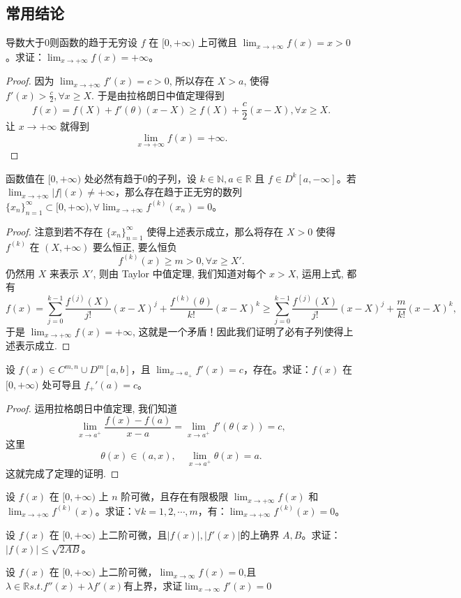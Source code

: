 \documentclass[lang=cn,10pt,thmcnt=section]{elegantbook}
\begin{document}
\subsection{常用结论}
\begin{theorem}
	导数大于0则函数的趋于无穷设 $f$ 在 $[0,+\infty)$ 上可微且 $\lim_{x \to +\infty} f(x) = x > 0$。求证：$\lim_{x \to +\infty} f(x) = +\infty$。
\end{theorem}
\begin{proof}
	因为 $\lim_{x\to+\infty} f'(x) = c > 0$, 所以存在 $X > a$, 使得 $f'(x) > \frac{c}{2}, \forall x \ge X$. 于是由拉格朗日中值定理得到
\[
f(x) = f(X) + f'(\theta)(x-X) \ge f(X) + \frac{c}{2}(x-X), \forall x \ge X.
\]
让 $x \to +\infty$ 就得到
\[
\lim_{x\to+\infty} f(x) = +\infty.
\]
\end{proof}
\begin{theorem}
	函数值在 $[0,+\infty)$ 处必然有趋于0的子列，设 $k \in \mathbb{N}, a \in \mathbb{R}$ 且 $f \in D^k[a,-\infty]$。若 $\lim_{x \to +\infty} |f|(x) \neq +\infty$，那么存在趋于正无穷的数列 $\{x_n\}_{n=1}^\infty \subset [0,+\infty), \forall \lim_{x \to +\infty} f^{(k)}(x_n) = 0$。
\end{theorem}
\begin{proof}
	注意到若不存在 $\{x_n\}_{n=1}^\infty$ 使得上述表示成立，那么将存在 $X>0$ 使得 $f^{(k)}$ 在 $(X, +\infty)$ 要么恒正, 要么恒负
\[
f^{(k)}(x) \ge m > 0, \forall x \ge X'.
\]
仍然用 $X$ 来表示 $X'$, 则由 Taylor 中值定理, 我们知道对每个 $x > X$, 运用上式, 都有
\[
f(x) = \sum_{j=0}^{k-1} \frac{f^{(j)}(X)}{j!}(x-X)^j + \frac{f^{(k)}(\theta)}{k!}(x-X)^k \ge \sum_{j=0}^{k-1} \frac{f^{(j)}(X)}{j!}(x-X)^j + \frac{m}{k!}(x-X)^k,
\]
于是 $\lim_{x\to+\infty} f(x) = +\infty$, 这就是一个矛盾！因此我们证明了必有子列使得上述表示成立.

\end{proof}
\begin{theorem}[导数极限定理]
	设 $f(x) \in C^{m,n} \cup D^m[a,b]$，且 $\lim_{x \to a_+} f'(x) = c$，存在。求证：$f(x)$ 在 $[0,+\infty)$ 处可导且 $f_+'(a) = c$。
\end{theorem}
\begin{proof}
	运用拉格朗日中值定理, 我们知道
\[
\lim_{x\to a^+} \frac{f(x) - f(a)}{x-a} = \lim_{x\to a^+} f'(\theta(x)) = c,
\]
这里
\[
\theta(x) \in (a,x), \quad \lim_{x\to a^+} \theta(x) = a.
\]
这就完成了定理的证明.
\end{proof}
\begin{theorem}[低阶导数控制高阶导数]
	设 $f(x)$ 在 $[0,+\infty)$ 上 $n$ 阶可微，且存在有限极限 $\lim_{x \to +\infty} f(x)$ 和 $\lim_{x \to +\infty} f^{(k)}(x)$。求证：$\forall k = 1,2,\cdots,m$，有：$\lim_{x \to +\infty} f^{(k)}(x) = 0$。
\end{theorem}
\begin{theorem}[低阶导数控制高阶导数]
	设 $f(x)$ 在 $[0,+\infty)$ 上二阶可微，且$
	|f(x)|,|f'(x)|$的上确界 $A,B$。求证：$|f(x)| \leq \sqrt{2AB}$。
\end{theorem}
\begin{theorem}[低阶导数控制高阶导数]
	设 $f(x)$ 在 $[0,+\infty)$ 上二阶可微，$\lim_{x \to \infty} f(x)=0 $,且$\lambda\in\mathbb{R} s.t.f''(x)+\lambda f'(x)$有上界，求证$\lim_{x \to \infty} f'(x)=0 $
\end{theorem}
\end{document}

